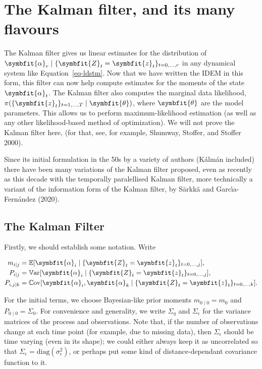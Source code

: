 \documentclass[
]{report}
\DeclareMathOperator{\var}{\mathbb{V}\mathrm{ar}}
\DeclareMathOperator{\cov}{\mathbb{C}\mathrm{ov}}
\newcommand{\bv}[1]{\symbfit{#1}}
\theoremstyle{plain}
\theoremstyle{plain}
\theoremstyle{remark}
\begin{document}
\chapter{The Kalman filter, and its many
flavours}\label{the-kalman-filter-and-its-many-flavours}

The Kalman filter gives us linear estimates for the distribution of
\(\bv\alpha_r\mid \{\bv Z_t=\bv z_t\}_{t=0,...,r}\) in any dynamical
system like Equation~\ref{eq-ldstm}. Now that we have written the IDEM
in this form, this filter can now help compute estimates for the moments
of the state \(\bv \alpha_t\). The Kalman filter also computes the
marginal data likelihood,
\(\pi(\{\bv z_t\}_{t=1,\dots, T}\mid \bv\theta)\), where \(\bv\theta\)
are the model parameters. This allows us to perform maximum-likelihood
estimation (as well as any other likelihood-based method of
optimization). We will not prove the Kalman filter here, (for that, see,
for example, Shumway, Stoffer, and Stoffer 2000).

Since its initial formulation in the 50s by a variety of authors (Kálmán
included) there have been many variations of the Kalman filter proposed,
even as recently as this decade with the temporally paralellised Kalman
filter, more technically a variant of the information form of the Kalman
filter, by Särkkä and Garcı́a-Fernández (2020).

\section{The Kalman Filter}\label{sec-kalmanfilter}

Firstly, we should establish some notation. Write

\[\begin{split}
m_{i \mid j} &= \mathbb E[\bv\alpha_i \mid \{\bv Z_t=\bv z_t\}_{t=0,\dots,j}],\\
P_{i \mid j} &= \var[\bv\alpha_i \mid \{\bv Z_t=\bv z_t\}_{t=0,\dots,j}],\\
P_{i,j \mid k} &= \cov[\bv\alpha_i, \bv\alpha_k \mid \{\bv Z_t=\bv z_t\}_{t=0,\dots,k}].
\end{split}
\]

For the initial terms, we choose Bayesian-like prior moments
\(m_{0\mid0}=m_0\) and \(P_{0\mid0}=\Sigma_0\). For convenience and
generality, we write \(\Sigma_\eta\) and \(\Sigma_\epsilon\) for the
variance matrices of the process and observations. Note that, if the
number of observations change at each time point (for example, due to
missing data), then \(\Sigma_\epsilon\) should be time varying (even in
its shape); we could either always keep it as uncorrelated so that
\(\Sigma_\epsilon = \mathrm{diag} (\sigma_\epsilon^2)\), or perhaps put
some kind of distance-dependant covariance function to it.
\end{document}

